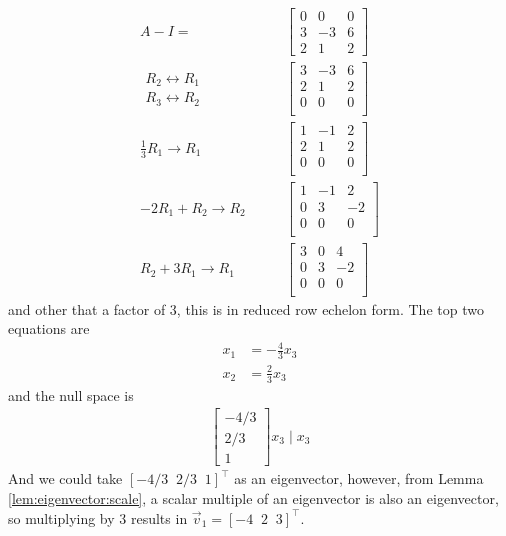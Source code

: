 \begin{example}
\begin{description}
\begin{align*}
A-I = & \begin{bmatrix}
0 & 0 & 0 \\
3 & -3 & 6 \\
2 & 1 & 2
\end{bmatrix} \\
\begin{array}{r}
R_2 \leftrightarrow R_1\\
R_3 \leftrightarrow R_2 
\end{array}
 \qquad & 
\begin{bmatrix}
3 & -3 & 6 \\
2 & 1 & 2\\
0 & 0 & 0 \\
\end{bmatrix} \\
\frac{1}{3} R_1 \rightarrow R_1 \qquad & 
\begin{bmatrix}
1 & -1 & 2 \\
2 & 1 & 2\\
0 & 0 & 0 \\
\end{bmatrix} \\
-2 R_1 + R_2 \rightarrow R_2 \qquad & 
\begin{bmatrix}
1 & -1 & 2 \\
0 & 3 & -2\\
0 & 0 & 0 \\
\end{bmatrix}\\
R_2 + 3R_1 \rightarrow R_1 \qquad & 
\begin{bmatrix}
3 & 0 & 4 \\
0 & 3 & -2\\
0 & 0 & 0 \\
\end{bmatrix}
\end{align*}
and other that a factor of 3, this is in reduced row echelon form.  The top two equations are
%
\begin{align*}
x_1 & = -\frac{4}{3} x_3 \\
x_2 & = \frac{2}{3} x_3
\end{align*}
and the null space is
%
\begin{align*}
\begin{bmatrix}
-4/3 \\ 2/3 \\ 1
\end{bmatrix} x_3 \; | \; x_3
\end{align*}
And we could take $[-4/3\;\;2/3\;\; 1]^{\intercal}$ as an eigenvector, however, from Lemma \ref{lem:eigenvector:scale}, a scalar multiple of an eigenvector is also an eigenvector, so multiplying by 3 results in $\vec{v}_1=[-4\;\;2\;\;3]^{\intercal}$.


\end{description}
\end{example}
